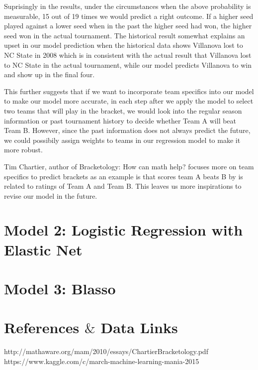 \documentclass{article} %
\begin{document}
Suprisingly in the results, under the circumstances when the above probability is measurable, 15 out of 19 times we would predict a right outcome. If a higher seed played against a lower seed when in the past the higher seed had won, the higher seed won in the actual tournament. The historical result somewhat explains an upset in our model prediction when the historical data shows Villanova lost to NC State in 2008 which is in consistent with the actual result that Villanova lost to NC State in the actual tournament, while our model predicts Villanova to win and show up in the final four. 

This further suggests that if we want to incorporate team specifics into our model to make our model more accurate, in each step after we apply the model to select two teams that will play in the bracket, we would look into the regular season information or past tournament history to decide whether Team A will beat Team B. However, since the past information does not always predict the future, we could possibily assign weights to teams in our regression model to make it more robust. 

Tim Chartier, author of Bracketology: How can math help? focuses more on team specifics to predict brackets as an example is that scores team A beats B by is related to ratings of Team A and Team B. This leaves us more inspirations to revise our model in the future. 






\section{Model 2: Logistic Regression with Elastic Net}
\section{Model 3: Blasso}








\section{References $\&$ Data Links}
http://mathaware.org/mam/2010/essays/ChartierBracketology.pdf
https://www.kaggle.com/c/march-machine-learning-mania-2015
\end{document}
